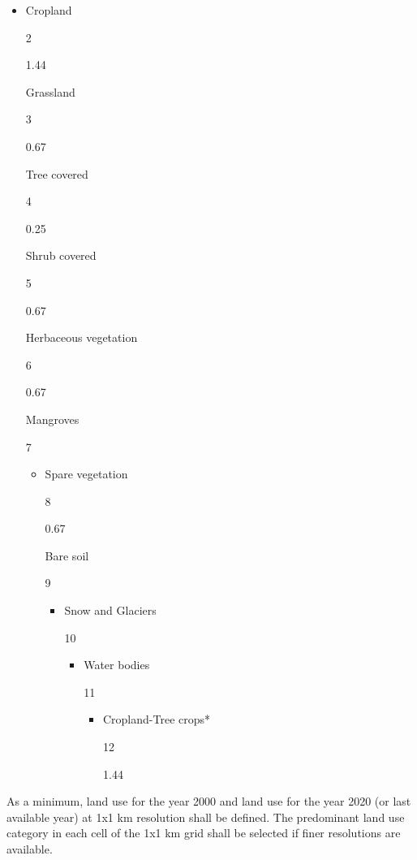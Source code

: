 \documentclass[
  10pt,
  b5paper,
]{book}
\begin{document}
\begin{itemize}
\item
  Cropland

  2

  1.44

  Grassland

  3

  0.67

  Tree covered

  4

  0.25

  Shrub covered

  5

  0.67

  Herbaceous vegetation

  6

  0.67

  Mangroves

  7

  \begin{itemize}
  \item
    Spare vegetation

    8

    0.67

    Bare soil

    9

    \begin{itemize}
    \item
      Snow and Glaciers

      10

      \begin{itemize}
      \item
        Water bodies

        11

        \begin{itemize}
        \item
          Cropland-Tree crops*

          12

          1.44
        \end{itemize}
      \end{itemize}
    \end{itemize}
  \end{itemize}
\end{itemize}

As a minimum, land use for the year 2000 and land use for the year 2020 (or last available year) at 1x1 km resolution shall be defined. The predominant land use category in each cell of the 1x1 km grid shall be selected if finer resolutions are available.
\end{document}
